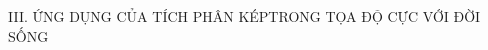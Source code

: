 \documentclass[preview]{standalone}
\begin{document}
\begin{center}
III. ỨNG DỤNG CỦA TÍCH PHÂN KÉPTRONG TỌA ĐỘ CỰC VỚI ĐỜI SỐNG
\end{center}
\end{document}
